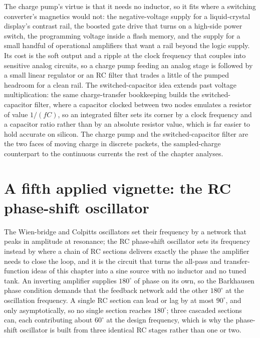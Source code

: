 The charge pump's virtue is that it needs no inductor, so it fits where a
switching converter's magnetics would not: the negative-voltage supply for a
liquid-crystal display's contrast rail, the boosted gate drive that turns on a
high-side power switch, the programming voltage inside a flash memory, and the
supply for a small handful of operational amplifiers that want a rail beyond the
logic supply. Its cost is the soft output and a ripple at the clock frequency
that couples into sensitive analog circuits, so a charge pump feeding an analog
stage is followed by a small linear regulator or an RC filter that trades a
little of the pumped headroom for a clean rail. The switched-capacitor idea
extends past voltage multiplication: the same charge-transfer bookkeeping builds
the switched-capacitor filter, where a capacitor clocked between two nodes
emulates a resistor of value $1/(fC)$, so an integrated filter sets its corner by
a clock frequency and a capacitor ratio rather than by an absolute resistor
value, which is far easier to hold accurate on silicon. The charge pump and the
switched-capacitor filter are the two faces of moving charge in discrete packets,
the sampled-charge counterpart to the continuous currents the rest of the chapter
analyses.

\section{A fifth applied vignette: the RC phase-shift oscillator}
\label{sec:vol04ch09:phase-shift}

The Wien-bridge and Colpitts oscillators set their frequency by a network that
peaks in amplitude at resonance; the RC phase-shift oscillator sets its frequency
instead by where a chain of RC sections delivers exactly the phase the amplifier
needs to close the loop, and it is the circuit that turns the all-pass and
transfer-function ideas of this chapter into a sine source with no inductor and no
tuned tank. An inverting amplifier supplies $180^\circ$ of phase on its own, so
the Barkhausen phase condition demands that the feedback network add the other
$180^\circ$ at the oscillation frequency. A single RC section can lead or lag by
at most $90^\circ$, and only asymptotically, so no single section reaches
$180^\circ$; three cascaded sections can, each contributing about $60^\circ$ at
the design frequency, which is why the phase-shift oscillator is built from three
identical RC stages rather than one or two.

